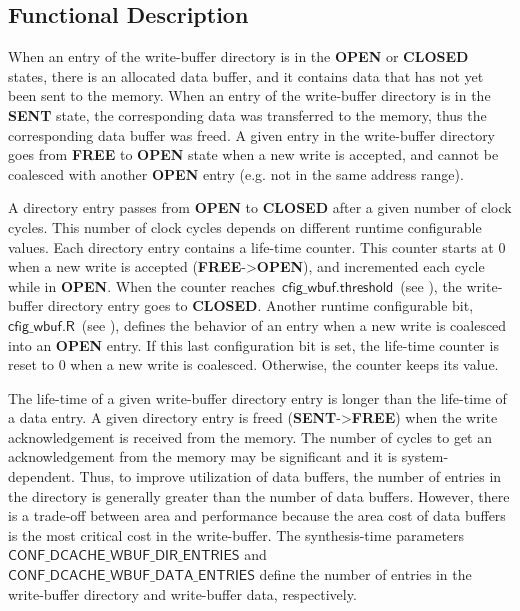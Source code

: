 \documentclass[10pt,titlepage,twoside]{book}
\begin{document}

\subsection{Functional Description}

When an entry of the write-buffer directory is in the \textbf{OPEN} or \textbf{CLOSED} states, there is an allocated data buffer, and it contains data that has not yet been sent to the memory.
When an entry of the write-buffer directory is in the \textbf{SENT} state, the corresponding data was transferred to the memory, thus the corresponding data buffer was freed.
A given entry in the write-buffer directory goes from \textbf{FREE} to \textbf{OPEN} state when a new write is accepted, and cannot be coalesced with another \textbf{OPEN} entry (e.g. not in the same address range).

A directory entry passes from \textbf{OPEN} to \textbf{CLOSED} after a given number of clock cycles.
This number of clock cycles depends on different runtime configurable values.
Each directory entry contains a life-time counter.
This counter starts at 0 when a new write is accepted (\textbf{FREE}->\textbf{OPEN}), and incremented each cycle while in \textbf{OPEN}.
When the counter reaches~$\mathsf{cfig\_wbuf.threshold}$~(see ), the write-buffer directory entry goes to \textbf{CLOSED}.
Another runtime configurable bit, $\mathsf{cfig\_wbuf.R}$~(see ), defines the behavior of an entry when a new write is coalesced into an \textbf{OPEN} entry.
If this last configuration bit is set, the life-time counter is reset to 0 when a new write is coalesced.
Otherwise, the counter keeps its value.

The life-time of a given write-buffer directory entry is longer than the life-time of a data entry.
A given directory entry is freed (\textbf{SENT}->\textbf{FREE}) when the write acknowledgement is received from the memory.
The number of cycles to get an acknowledgement from the memory may be significant and it is system-dependent.
Thus, to improve utilization of data buffers, the number of entries in the directory is generally greater than the number of data buffers.
However, there is a trade-off between area and performance because the area cost of data buffers is the most critical cost in the write-buffer.
The synthesis-time parameters $\mathsf{CONF\_DCACHE\_WBUF\_DIR\_ENTRIES}$ and $\mathsf{CONF\_DCACHE\_WBUF\_DATA\_ENTRIES}$ define the number of entries in the write-buffer directory and write-buffer data, respectively.
\end{document}
